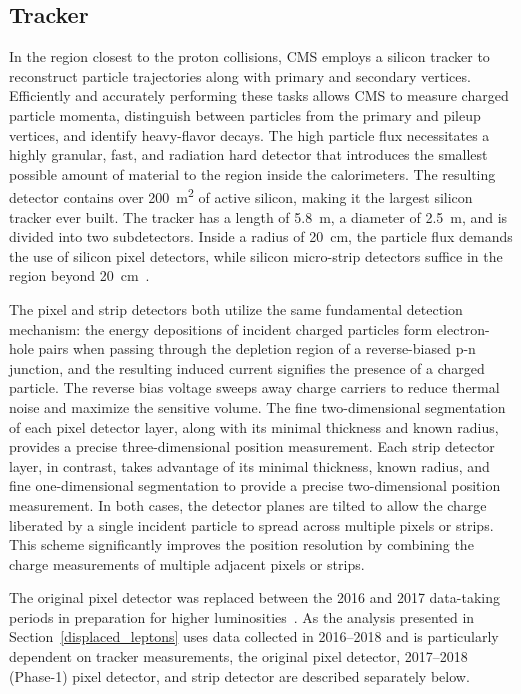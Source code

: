 \subsection{Tracker}
\label{tracker}
In the region closest to the proton collisions, CMS employs a silicon tracker to reconstruct particle trajectories along with primary and secondary vertices. Efficiently and accurately performing these tasks allows CMS to measure charged particle momenta, distinguish between particles from the primary and pileup vertices, and identify heavy-flavor decays. The high particle flux necessitates a highly granular, fast, and radiation hard detector that introduces the smallest possible amount of material to the region inside the calorimeters. The resulting detector contains over \SI{200}{\m\tothe{2}} of active silicon, making it the largest silicon tracker ever built. The tracker has a length of \SI{5.8}{\m}, a diameter of \SI{2.5}{\m}, and is divided into two subdetectors. Inside a radius of \SI{20}{\cm}, the particle flux demands the use of silicon pixel detectors, while silicon micro-strip detectors suffice in the region beyond \SI{20}{\cm}~\cite{cms_experiment}. 

The pixel and strip detectors both utilize the same fundamental detection mechanism: the energy depositions of incident charged particles form electron-hole pairs when passing through the depletion region of a reverse-biased p-n junction, and the resulting induced current signifies the presence of a charged particle. The reverse bias voltage sweeps away charge carriers to reduce thermal noise and maximize the sensitive volume. The fine two-dimensional segmentation of each pixel detector layer, along with its minimal thickness and known radius, provides a precise three-dimensional position measurement. Each strip detector layer, in contrast, takes advantage of its minimal thickness, known radius, and fine one-dimensional segmentation to provide a precise two-dimensional position measurement. In both cases, the detector planes are tilted to allow the charge liberated by a single incident particle to spread across multiple pixels or strips. This scheme significantly improves the position resolution by combining the charge measurements of multiple adjacent pixels or strips.

The original pixel detector was replaced between the 2016 and 2017 data-taking periods in preparation for higher luminosities~\cite{cms_phase1_pixels}. As the analysis presented in Section~\ref{displaced_leptons} uses data collected in 2016--2018 and is particularly dependent on tracker measurements, the original pixel detector, 2017--2018 (Phase-1) pixel detector, and strip detector are described separately below.


